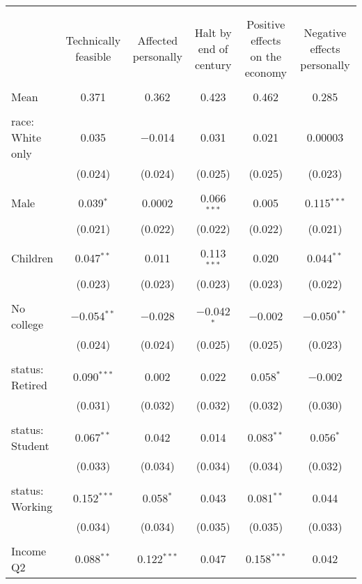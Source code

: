 
\begin{tabular}{@{\extracolsep{5pt}}lccccc} 
\\[-1.8ex]\hline 
\hline \\[-1.8ex] 
\\[-1.8ex] & Technically feasible & Affected personally & Halt by end of century & Positive effects on the economy & Negative effects personally \\ 
\hline \\[-1.8ex] 
 Mean & 0.371 & 0.362 & 0.423 & 0.462 & 0.285  \\ \hline \\[-1.8ex] race: White only & 0.035 & $-$0.014 & 0.031 & 0.021 & 0.00003 \\ 
  & (0.024) & (0.024) & (0.025) & (0.025) & (0.023) \\ 
  & & & & & \\ 
 Male & 0.039$^{*}$ & 0.0002 & 0.066$^{***}$ & 0.005 & 0.115$^{***}$ \\ 
  & (0.021) & (0.022) & (0.022) & (0.022) & (0.021) \\ 
  & & & & & \\ 
 Children & 0.047$^{**}$ & 0.011 & 0.113$^{***}$ & 0.020 & 0.044$^{**}$ \\ 
  & (0.023) & (0.023) & (0.023) & (0.023) & (0.022) \\ 
  & & & & & \\ 
 No college & $-$0.054$^{**}$ & $-$0.028 & $-$0.042$^{*}$ & $-$0.002 & $-$0.050$^{**}$ \\ 
  & (0.024) & (0.024) & (0.025) & (0.025) & (0.023) \\ 
  & & & & & \\ 
 status: Retired & 0.090$^{***}$ & 0.002 & 0.022 & 0.058$^{*}$ & $-$0.002 \\ 
  & (0.031) & (0.032) & (0.032) & (0.032) & (0.030) \\ 
  & & & & & \\ 
 status: Student & 0.067$^{**}$ & 0.042 & 0.014 & 0.083$^{**}$ & 0.056$^{*}$ \\ 
  & (0.033) & (0.034) & (0.034) & (0.034) & (0.032) \\ 
  & & & & & \\ 
 status: Working & 0.152$^{***}$ & 0.058$^{*}$ & 0.043 & 0.081$^{**}$ & 0.044 \\ 
  & (0.034) & (0.034) & (0.035) & (0.035) & (0.033) \\ 
  & & & & & \\ 
 Income Q2 & 0.088$^{**}$ & 0.122$^{***}$ & 0.047 & 0.158$^{***}$ & 0.042 \\ 

\end{tabular}
